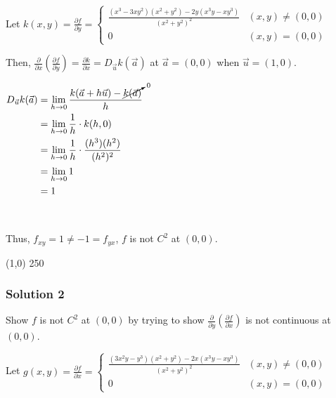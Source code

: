 {~~~}

Let $k(x,y) = \frac{\partial f}{\partial y} =
    \begin{cases}
        \frac{(x^3 - 3xy^2)(x^2 + y^2) - 2y(x^3y - xy^3)}{(x^2 + y^2)^2} & (x,y) \neq (0,0) \\
        0                                                                & (x,y) = (0,0)
    \end{cases}$

Then, $\frac{\partial}{\partial x}\left( \frac{\partial f}{\partial y} \right) = \frac{\partial k}{\partial x} = D_{\vec{u}} k(\vec{a})$ at $\vec{a} = (0,0)$ when $\vec{u} = (1,0)$. 

$\begin{aligned}[t]
    D_{\vec{u}} k(\vec{a}) & = \lim_{h\to0} \frac{k(\vec{a} + h\vec{u}) - \cancelto{0}{k(\vec{a})}}{h} \\
                           & = \lim_{h\to0} \frac{1}{h} \cdot k(h,0)                                   \\
                           & = \lim_{h\to0} \frac{1}{h} \cdot \frac{(h^3)(h^2)}{(h^2)^2}               \\
                           & = \lim_{h\to0} 1                                                          \\
                           & = 1
\end{aligned}$

{~~~}

Thus, $f_{xy} = 1 \neq -1 = f_{yx}$, $f$ is not $C^2$ at $(0,0)$. 

\begin{center} \line(1,0) {250} \end{center}

\subsubsection*{Solution 2}

Show $f$ is not $C^2$ at $(0,0)$ by trying to show $\frac{\partial}{\partial y}\left(\frac{\partial f}{\partial x}\right)$ is not continuous at $(0,0)$. 

Let $g(x,y) = \frac{\partial f}{\partial x} =
    \begin{cases}
        \frac{(3x^2y - y^3)(x^2 + y^2) - 2x(x^3y - xy^3)}{(x^2 + y^2)^2} & (x,y) \neq (0,0) \\
        0                                                                & (x,y) = (0,0)
    \end{cases}$

